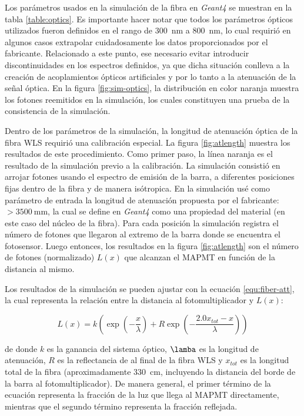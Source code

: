Los parámetros usados en la simulación de la fibra en \emph{Geant4} se muestran en la tabla \ref{table:optics}. Es importante hacer notar que todos los parámetros ópticos utilizados fueron definidos en el rango de \SI{300}{\nano\metre} a \SI{800}{\nano\metre}, lo cual requirió en algunos casos extrapolar cuidadosamente los datos proporcionados por el fabricante. Relacionado a este punto, ese necesario evitar introducir discontinuidades en los espectros definidos, ya que dicha situación conlleva a la creación de acoplamientos ópticos artificiales y por lo tanto a la atenuación de la señal óptica. En la figura \ref{fig:sim-optics}, la distribución en color naranja muestra los fotones reemitidos en la simulación, los cuales constituyen una prueba de la consistencia de la simulación.

Dentro de los parámetros de la simulación, la longitud de atenuación óptica de la fibra WLS requirió una calibración especial. La figura \ref{fig:atlength} muestra los resultados de este procedimiento. Como primer paso, la línea naranja es el resultado de la simulación previo a la calibración. La simulación consistió en arrojar fotones usando el espectro de emisión de la barra, a diferentes posiciones fijas dentro de la fibra y de manera isótropica. En la simulación usé como parámetro de entrada la longitud de atenuación propuesta por el fabricante: $>\SI{3500}{\milli\metre}$, la cual se define en \emph{Geant4} como una propiedad del material (en este caso del núcleo de la fibra). Para cada posición la simulación registra el número de fotones que llegaron al extremo de la barra donde se encuentra el fotosensor. Luego entonces, los resultados en la figura \ref{fig:atlength} son el número de fotones (normalizado) $L(x)$ que alcanzan el MAPMT en función de la distancia al mismo.

Los resultados de la simulación se pueden ajustar con la ecuación \ref{equ:fiber-att}, la cual representa la relación entre la distancia al fotomultiplicador y $L(x)$:

\begin{equation}
\label{equ:fiber-att}
L(x)=k\left(\exp\left(-\frac{x}{\lambda}\right) +R\exp\left(-\frac{2.0x_{tot}-x}{\lambda}\right)\right)
\end{equation}

de donde $k$ es la ganancia del sistema óptico, $\lamba$ es la longitud de atenuación, $R$ es la reflectancia de al final de la fibra WLS y $x_{tot}$ es la longitud total de la fibra (aproximadamente \SI{330}{\cm}, incluyendo la distancia del borde de la barra al fotomultiplicador). De manera general, el primer término de la ecuación representa la fracción de la luz que llega al MAPMT directamente, mientras que el segundo término representa la fracción reflejada.

